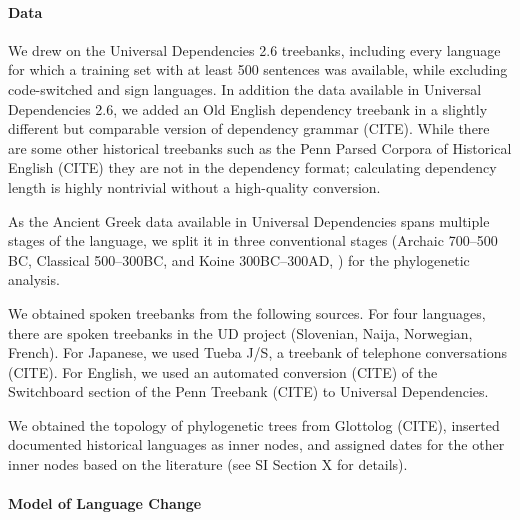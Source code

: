 \documentclass[11pt,a4paper]{article}
\begin{document}
\paragraph{Data}
We drew on the Universal Dependencies 2.6 treebanks, including every language for which a training set with at least 500 sentences was available, while excluding code-switched and sign languages.
In addition the data available in Universal Dependencies 2.6, we added an Old English dependency treebank in a slightly different but comparable version of dependency grammar (CITE).
While there are some other historical treebanks such as the Penn Parsed Corpora of Historical English (CITE) they are not in the dependency format; calculating dependency length is highly nontrivial without a high-quality conversion.

As the Ancient Greek data available in Universal Dependencies spans multiple stages of the language, we split it in three conventional stages (Archaic 700--500 BC, Classical 500--300BC, and Koine 300BC--300AD, \citet{taylor1994change}) for the phylogenetic analysis. 

We obtained spoken treebanks from the following sources.
For four languages, there are spoken treebanks in the UD project (Slovenian, Naija, Norwegian, French). For Japanese, we used Tueba J/S, a treebank of telephone conversations (CITE). For English, we used an automated conversion (CITE) of the Switchboard section of the Penn Treebank (CITE) to Universal Dependencies.

We obtained the topology of phylogenetic trees from Glottolog (CITE), inserted documented historical languages as inner nodes, and assigned dates for the other inner nodes based on the literature (see SI Section X for details).

\paragraph{Model of Language Change}


\end{document}
